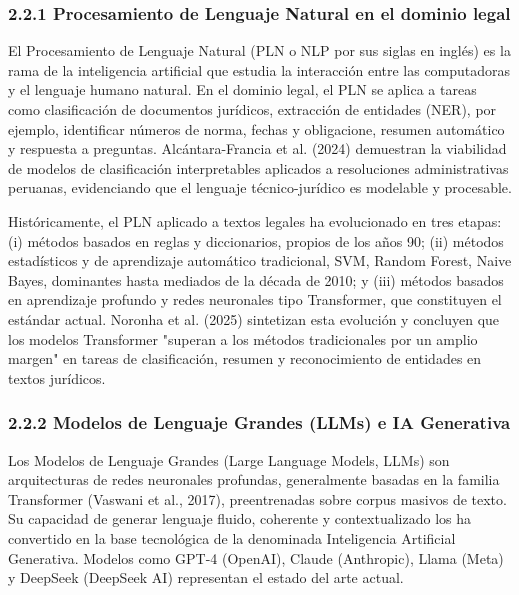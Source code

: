 \documentclass[12pt,a4paper,oneside]{report}
\begin{document}
\subsubsection{2.2.1 Procesamiento de Lenguaje Natural en el dominio
legal}\label{procesamiento-de-lenguaje-natural-en-el-dominio-legal}

El Procesamiento de Lenguaje Natural (PLN o NLP por sus siglas en
inglés) es la rama de la inteligencia artificial que estudia la
interacción entre las computadoras y el lenguaje humano natural. En el
dominio legal, el PLN se aplica a tareas como clasificación de
documentos jurídicos, extracción de entidades (NER), por ejemplo,
identificar números de norma, fechas y obligacione, resumen automático y
respuesta a preguntas. Alcántara-Francia et al. (2024) demuestran la
viabilidad de modelos de clasificación interpretables aplicados a
resoluciones administrativas peruanas, evidenciando que el lenguaje
técnico-jurídico es modelable y procesable.

Históricamente, el PLN aplicado a textos legales ha evolucionado en tres
etapas: (i) métodos basados en reglas y diccionarios, propios de los
años 90; (ii) métodos estadísticos y de aprendizaje automático
tradicional, SVM, Random Forest, Naive Bayes, dominantes hasta mediados
de la década de 2010; y (iii) métodos basados en aprendizaje profundo y
redes neuronales tipo Transformer, que constituyen el estándar actual.
Noronha et al. (2025) sintetizan esta evolución y concluyen que los
modelos Transformer "superan a los métodos tradicionales por un amplio
margen" en tareas de clasificación, resumen y reconocimiento de
entidades en textos jurídicos.

\subsubsection{2.2.2 Modelos de Lenguaje Grandes (LLMs) e IA
Generativa}\label{modelos-de-lenguaje-grandes-llms-e-ia-generativa}

Los Modelos de Lenguaje Grandes (Large Language Models, LLMs) son
arquitecturas de redes neuronales profundas, generalmente basadas en la
familia Transformer (Vaswani et al., 2017), preentrenadas sobre corpus
masivos de texto. Su capacidad de generar lenguaje fluido, coherente y
contextualizado los ha convertido en la base tecnológica de la
denominada Inteligencia Artificial Generativa. Modelos como GPT-4
(OpenAI), Claude (Anthropic), Llama (Meta) y DeepSeek (DeepSeek AI)
representan el estado del arte actual.
\end{document}
